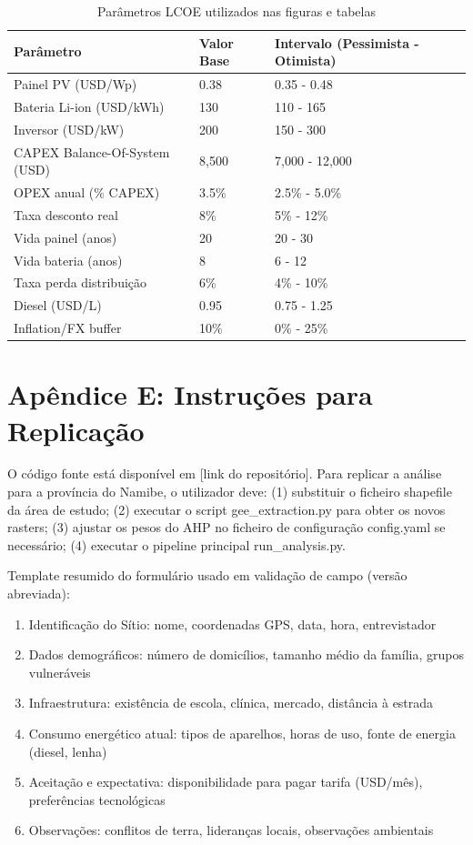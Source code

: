 \documentclass[12pt, a4paper]{article}
\begin{document}
\begin{table}[H]
\centering
\small
\begin{tabular}{|l|l|l|}
\hline
Parâmetro & Valor Base & Intervalo (Pessimista - Otimista) \\
\hline
Painel PV (USD/Wp) & 0.38 & 0.35 - 0.48 \\
Bateria Li-ion (USD/kWh) & 130 & 110 - 165 \\
Inversor (USD/kW) & 200 & 150 - 300 \\
CAPEX Balance-Of-System (USD) & 8,500 & 7,000 - 12,000 \\
OPEX anual (\% CAPEX) & 3.5\% & 2.5\% - 5.0\% \\
Taxa desconto real & 8\% & 5\% - 12\% \\
Vida painel (anos) & 20 & 20 - 30 \\
Vida bateria (anos) & 8 & 6 - 12 \\
Taxa perda distribuição & 6\% & 4\% - 10\% \\
Diesel (USD/L) & 0.95 & 0.75 - 1.25 \\
Inflation/FX buffer & 10\% & 0\% - 25\% \\
\hline
\end{tabular}
\caption{Parâmetros LCOE utilizados nas figuras e tabelas}
\end{table}

\section*{Apêndice E: Instruções para Replicação}

O código fonte está disponível em [link do repositório]. Para replicar a análise para a província do Namibe, o utilizador deve: (1) substituir o ficheiro shapefile da área de estudo; (2) executar o script gee\_extraction.py para obter os novos rasters; (3) ajustar os pesos do AHP no ficheiro de configuração config.yaml se necessário; (4) executar o pipeline principal run\_analysis.py.

Template resumido do formulário usado em validação de campo (versão abreviada):

\begin{enumerate}
\item Identificação do Sítio: nome, coordenadas GPS, data, hora, entrevistador
\item Dados demográficos: número de domicílios, tamanho médio da família, grupos vulneráveis
\item Infraestrutura: existência de escola, clínica, mercado, distância à estrada
\item Consumo energético atual: tipos de aparelhos, horas de uso, fonte de energia (diesel, lenha)
\item Aceitação e expectativa: disponibilidade para pagar tarifa (USD/mês), preferências tecnológicas
\item Observações: conflitos de terra, lideranças locais, observações ambientais
\end{enumerate}
\end{document}
